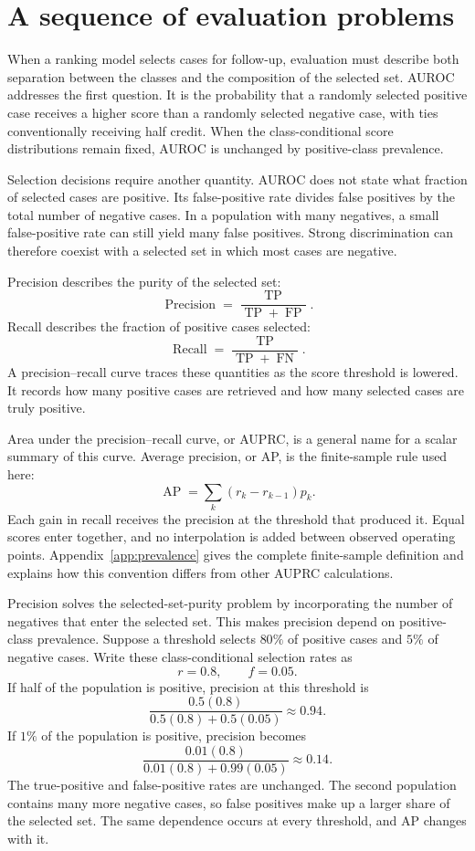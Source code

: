 \documentclass[11pt]{article}
\newcommand{\AP}{\operatorname{AP}}
\theoremstyle{remark}
\begin{document}
\begingroup
\small
\setlength{\parskip}{0pt}
\tableofcontents
\endgroup
\newpage

\section{A sequence of evaluation problems}

When a ranking model selects cases for follow-up, evaluation must describe both separation between the classes and the composition of the selected set. AUROC addresses the first question. It is the probability that a randomly selected positive case receives a higher score than a randomly selected negative case, with ties conventionally receiving half credit. When the class-conditional score distributions remain fixed, AUROC is unchanged by positive-class prevalence.

Selection decisions require another quantity. AUROC does not state what fraction of selected cases are positive. Its false-positive rate divides false positives by the total number of negative cases. In a population with many negatives, a small false-positive rate can still yield many false positives. Strong discrimination can therefore coexist with a selected set in which most cases are negative.

Precision describes the purity of the selected set:
\[
\operatorname{Precision}
=
\frac{\operatorname{TP}}{\operatorname{TP}+\operatorname{FP}}.
\]
Recall describes the fraction of positive cases selected:
\[
\operatorname{Recall}
=
\frac{\operatorname{TP}}{\operatorname{TP}+\operatorname{FN}}.
\]
A precision--recall curve traces these quantities as the score threshold is lowered. It records how many positive cases are retrieved and how many selected cases are truly positive.

Area under the precision--recall curve, or AUPRC, is a general name for a scalar summary of this curve. Average precision, or AP, is the finite-sample rule used here:
\[
\AP
=
\sum_k (r_k-r_{k-1})p_k.
\]
Each gain in recall receives the precision at the threshold that produced it. Equal scores enter together, and no interpolation is added between observed operating points. Appendix~\ref{app:prevalence} gives the complete finite-sample definition and explains how this convention differs from other AUPRC calculations.

Precision solves the selected-set-purity problem by incorporating the number of negatives that enter the selected set. This makes precision depend on positive-class prevalence. Suppose a threshold selects $80\%$ of positive cases and $5\%$ of negative cases. Write these class-conditional selection rates as
\[
r=0.8,
\qquad
f=0.05.
\]
If half of the population is positive, precision at this threshold is
\[
\frac{0.5(0.8)}{0.5(0.8)+0.5(0.05)}
\approx 0.94.
\]
If $1\%$ of the population is positive, precision becomes
\[
\frac{0.01(0.8)}{0.01(0.8)+0.99(0.05)}
\approx 0.14.
\]
The true-positive and false-positive rates are unchanged. The second population contains many more negative cases, so false positives make up a larger share of the selected set. The same dependence occurs at every threshold, and AP changes with it.
\end{document}
